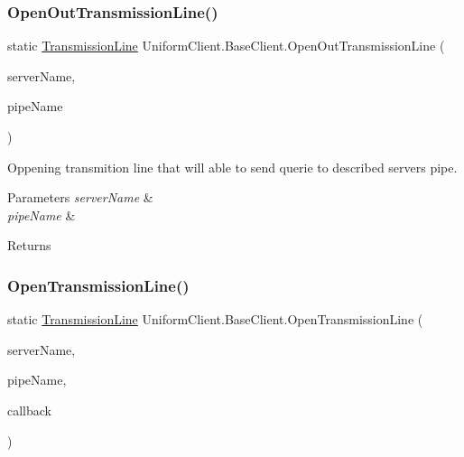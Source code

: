 \subsubsection{\texorpdfstring{Open\+Out\+Transmission\+Line()}{OpenOutTransmissionLine()}}
{\footnotesize\ttfamily static \mbox{\hyperlink{class_pipes_provider_1_1_client_1_1_transmission_line}{Transmission\+Line}} Uniform\+Client.\+Base\+Client.\+Open\+Out\+Transmission\+Line (\begin{DoxyParamCaption}\item[{string}]{server\+Name,  }\item[{string}]{pipe\+Name }\end{DoxyParamCaption})\hspace{0.3cm}{\ttfamily [static]}}



Oppening transmition line that will able to send querie to described server\textquotesingle{}s pipe. 


\begin{DoxyParams}{Parameters}
{\em server\+Name} & \\
\hline
{\em pipe\+Name} & \\
\hline
\end{DoxyParams}
\begin{DoxyReturn}{Returns}

\end{DoxyReturn}
\mbox{\label{class_uniform_client_1_1_base_client_afc171a7bb5cdd654902bdd599ae64ea4}} 
\subsubsection{\texorpdfstring{Open\+Transmission\+Line()}{OpenTransmissionLine()}\hspace{0.1cm}{\footnotesize\ttfamily [1/2]}}
{\footnotesize\ttfamily static \mbox{\hyperlink{class_pipes_provider_1_1_client_1_1_transmission_line}{Transmission\+Line}} Uniform\+Client.\+Base\+Client.\+Open\+Transmission\+Line (\begin{DoxyParamCaption}\item[{string}]{server\+Name,  }\item[{string}]{pipe\+Name,  }\item[{System.\+Action$<$ \mbox{\hyperlink{class_pipes_provider_1_1_client_1_1_transmission_line}{Transmission\+Line}} $>$}]{callback }\end{DoxyParamCaption})\hspace{0.3cm}{\ttfamily [static]}}



